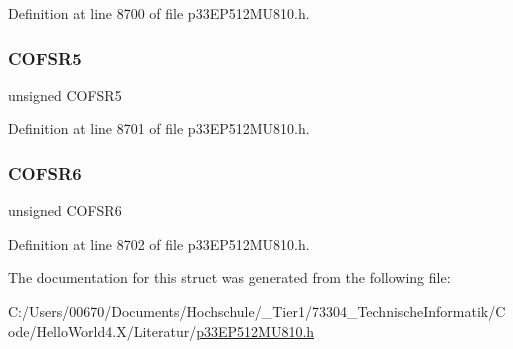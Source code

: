 Definition at line 8700 of file p33\+E\+P512\+M\+U810.\+h.

\mbox{\label{structtag_r_p_i_n_r25_b_i_t_s_ab9ef65110b3359ee746828bc96a577de}} 
\subsubsection{\texorpdfstring{C\+O\+F\+S\+R5}{COFSR5}}
{\footnotesize\ttfamily unsigned C\+O\+F\+S\+R5}



Definition at line 8701 of file p33\+E\+P512\+M\+U810.\+h.

\mbox{\label{structtag_r_p_i_n_r25_b_i_t_s_a2eb1261741b67e7a548ea0dfc1e7c7da}} 
\subsubsection{\texorpdfstring{C\+O\+F\+S\+R6}{COFSR6}}
{\footnotesize\ttfamily unsigned C\+O\+F\+S\+R6}



Definition at line 8702 of file p33\+E\+P512\+M\+U810.\+h.



The documentation for this struct was generated from the following file\+:\begin{DoxyCompactItemize}
\item 
C\+:/\+Users/00670/\+Documents/\+Hochschule/\+\_\+\+Tier1/73304\+\_\+\+Technische\+Informatik/\+Code/\+Hello\+World4.\+X/\+Literatur/\hyperlink{p33_e_p512_m_u810_8h}{p33\+E\+P512\+M\+U810.\+h}\end{DoxyCompactItemize}
